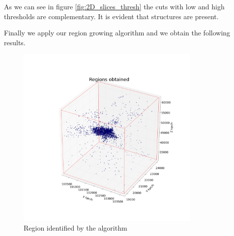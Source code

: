 \documentclass[12pt]{article}
\begin{document}
As we can see in figure \ref{fig:2D_slices_thresh} the cuts with low and high thresholds are complementary. It is evident that structures are present. 

Finally we apply our region growing algorithm and we obtain the following results.\\

\begin{figure}[ht]
\begin{center}
\includegraphics[width=0.8\textwidth]{graphs/regions_small.png} %
\caption{Region identified by the algorithm}
\label{fg:regions_speed_th_1}
\end{center}
\end{figure}
\FloatBarrier
\end{document}
